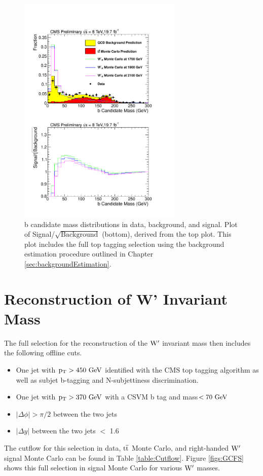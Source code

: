 \begin{figure}[htcb]
\begin{center}
\includegraphics[width=0.7\textwidth]{AN-13-004/figs/bmassdatatosigwithdata.pdf}
\caption{
b candidate mass distributions in data, background, and signal.  Plot of Signal/$\sqrt{\text{Background}}$ (bottom), derived from the top plot. 
This plot includes the full top tagging selection using the background estimation procedure outlined in Chapter \ref{sec:backgroundEstimation}.
}
\label{figs:BmassCOMP}
\end{center}
\end{figure}


\section{Reconstruction of W' Invariant Mass}
\label{sec:fullselection}
The full selection for the reconstruction of the $\mathrm{W}^\prime$ invariant mass then includes the following offline cuts.
\begin{itemize}
\item One jet with $\mathrm{p_{T}} > 450~\mathrm{GeV}$ identified with the CMS top tagging algorithm as well as subjet b-tagging and N-subjettiness discrimination.
\item One jet with $\mathrm{p_{T}} > 370~\mathrm{GeV}$ with a CSVM b tag and mass$ < 70~\mathrm{GeV}$
\item $|\Delta \phi| > \pi/2$ between the two jets
\item $|\Delta y|$ between the two jets $<$ 1.6 
\end{itemize}
The cutflow for this selection in data, $\mathrm{t\overline{t}}$ Monte Carlo, and right-handed $\mathrm{W}^\prime$ signal Monte Carlo can be found in Table \ref{table:Cutflow}.
Figure \ref{figs:GCFS} shows this full selection in signal Monte Carlo for various $\mathrm{W}^\prime$ masses.  




